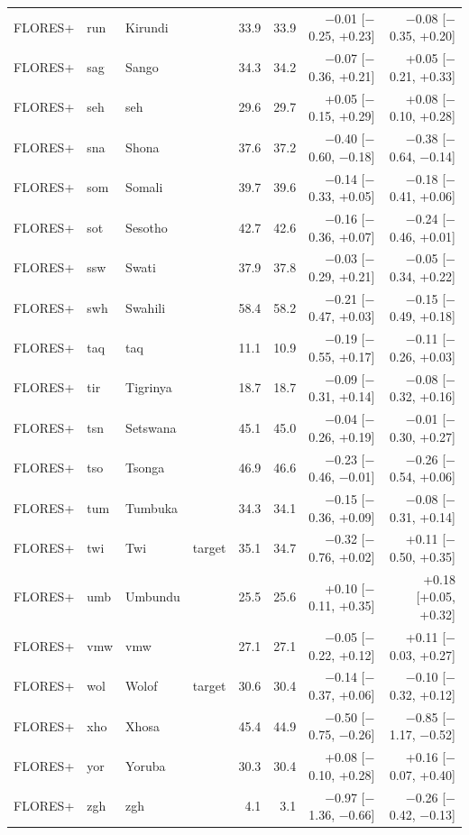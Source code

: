{\begin{longtable}{@{}lllcrrrr@{}}
FLORES+ & run & Kirundi &  & 33.9 & 33.9 & $-$0.01 [$-$0.25, +0.23] & $-$0.08 [$-$0.35, +0.20] \\
FLORES+ & sag & Sango &  & 34.3 & 34.2 & $-$0.07 [$-$0.36, +0.21] & +0.05 [$-$0.21, +0.33] \\
FLORES+ & seh & seh &  & 29.6 & 29.7 & +0.05 [$-$0.15, +0.29] & +0.08 [$-$0.10, +0.28] \\
FLORES+ & sna & Shona &  & 37.6 & 37.2 & $-$0.40 [$-$0.60, $-$0.18] & $-$0.38 [$-$0.64, $-$0.14] \\
FLORES+ & som & Somali &  & 39.7 & 39.6 & $-$0.14 [$-$0.33, +0.05] & $-$0.18 [$-$0.41, +0.06] \\
FLORES+ & sot & Sesotho &  & 42.7 & 42.6 & $-$0.16 [$-$0.36, +0.07] & $-$0.24 [$-$0.46, +0.01] \\
FLORES+ & ssw & Swati &  & 37.9 & 37.8 & $-$0.03 [$-$0.29, +0.21] & $-$0.05 [$-$0.34, +0.22] \\
FLORES+ & swh & Swahili &  & 58.4 & 58.2 & $-$0.21 [$-$0.47, +0.03] & $-$0.15 [$-$0.49, +0.18] \\
FLORES+ & taq & taq &  & 11.1 & 10.9 & $-$0.19 [$-$0.55, +0.17] & $-$0.11 [$-$0.26, +0.03] \\
FLORES+ & tir & Tigrinya &  & 18.7 & 18.7 & $-$0.09 [$-$0.31, +0.14] & $-$0.08 [$-$0.32, +0.16] \\
FLORES+ & tsn & Setswana &  & 45.1 & 45.0 & $-$0.04 [$-$0.26, +0.19] & $-$0.01 [$-$0.30, +0.27] \\
FLORES+ & tso & Tsonga &  & 46.9 & 46.6 & $-$0.23 [$-$0.46, $-$0.01] & $-$0.26 [$-$0.54, +0.06] \\
FLORES+ & tum & Tumbuka &  & 34.3 & 34.1 & $-$0.15 [$-$0.36, +0.09] & $-$0.08 [$-$0.31, +0.14] \\
FLORES+ & twi & Twi & target & 35.1 & 34.7 & $-$0.32 [$-$0.76, +0.02] & +0.11 [$-$0.50, +0.35] \\
FLORES+ & umb & Umbundu &  & 25.5 & 25.6 & +0.10 [$-$0.11, +0.35] & +0.18 [+0.05, +0.32] \\
FLORES+ & vmw & vmw &  & 27.1 & 27.1 & $-$0.05 [$-$0.22, +0.12] & +0.11 [$-$0.03, +0.27] \\
FLORES+ & wol & Wolof & target & 30.6 & 30.4 & $-$0.14 [$-$0.37, +0.06] & $-$0.10 [$-$0.32, +0.12] \\
FLORES+ & xho & Xhosa &  & 45.4 & 44.9 & $-$0.50 [$-$0.75, $-$0.26] & $-$0.85 [$-$1.17, $-$0.52] \\
FLORES+ & yor & Yoruba &  & 30.3 & 30.4 & +0.08 [$-$0.10, +0.28] & +0.16 [$-$0.07, +0.40] \\
FLORES+ & zgh & zgh &  & 4.1 & 3.1 & $-$0.97 [$-$1.36, $-$0.66] & $-$0.26 [$-$0.42, $-$0.13] \\

\end{longtable}}
